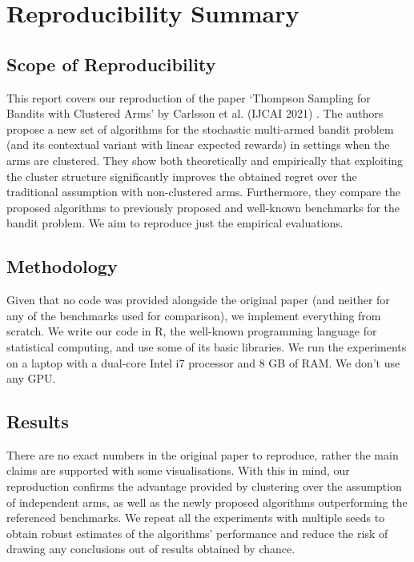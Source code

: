 \section*{\centering Reproducibility Summary}

\subsection*{Scope of Reproducibility}

This report covers our reproduction of the paper `Thompson Sampling for Bandits with Clustered Arms' by Carlsson et al. (IJCAI 2021) \cite{bandits}. The authors propose a new set of algorithms for the stochastic multi-armed bandit problem (and its contextual variant with linear expected rewards) in settings when the arms are clustered. They show both theoretically and empirically that exploiting the cluster structure significantly improves the obtained regret over the traditional assumption with non-clustered arms. Furthermore, they compare the proposed algorithms to previously proposed and well-known benchmarks for the bandit problem. We aim to reproduce just the empirical evaluations.

\subsection*{Methodology}

Given that no code was provided alongside the original paper (and neither for any of the benchmarks used for comparison), we implement everything from scratch. We write our code in R, the well-known programming language for statistical computing, and use some of its basic libraries. We run the experiments on a laptop with a dual-core Intel i7 processor and 8 GB of RAM. We don't use any GPU.

\subsection*{Results}

There are no exact numbers in the original paper to reproduce, rather the main claims are supported with some visualisations. With this in mind, our reproduction confirms the advantage provided by clustering over the assumption of independent arms, as well as the newly proposed algorithms outperforming the referenced benchmarks. We repeat all the experiments with multiple seeds to obtain robust estimates of the algorithms' performance and reduce the risk of drawing any conclusions out of results obtained by chance. 

